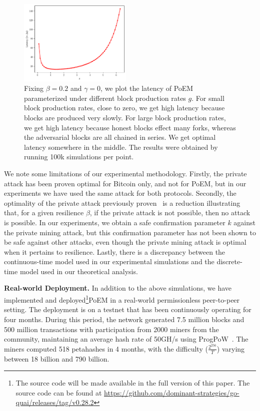 \begin{figure}[pt]
    \centering
    \includegraphics[width = 0.48\textwidth]{figures/g_latency.pdf}

  \caption{Fixing $\beta=0.2$ and $\gamma=0$, we plot the latency of PoEM parameterized under different block production rates $g$.
          For small block production rates, close to zero, we get high latency because blocks are produced very slowly.
          For large block production rates, we get high latency because honest blocks effect many forks, whereas the adversarial blocks
          are all chained in series. We get optimal latency somewhere in the middle.
          The results were obtained by running 100k simulations per point.}
    \label{fig:g_latency}
\end{figure}

We note some limitations of our experimental methodology. Firstly, the private attack has been proven optimal
for Bitcoin only, and not for PoEM, but in our experiments we have used the same attack for both protocols.
Secondly, the optimality of the private attack previously proven~\cite{eiar} is a reduction illustrating
that, for a given resilience $\beta$, if the private attack is not possible, then no attack is possible.
In our experiments, we obtain a safe confirmation parameter $k$ against the private mining attack,
but this confirmation parameter has not been shown to be safe against other attacks, even though the private
mining attack is optimal when it pertains to resilience.
Lastly, there is a discrepancy between the continuous-time model used in our experimental simulations
and the discrete-time model used in our theoretical analysis.

\noindent
\textbf{Real-world Deployment.}
In addition to the above simulations,
we have implemented and deployed\ifanonymous\else\footnote{
    \ifanonymous
        The source code will be made available in the full version of this paper.
    \else
        The source code can be found at
        \url{https://github.com/dominant-strategies/go-quai/releases/tag/v0.28.2}
    \fi
}\fi PoEM in a real-world permissionless peer-to-peer
setting.
The deployment is on a testnet that has been continuously operating for
four months. During this period, the network generated 7.5 million blocks
and 500 million transactions
with participation from 2000 miners from the community, maintaining an
average hash rate of 50GH/s using ProgPoW~\cite{progpow}.
The miners computed 518 petahashes in 4 months,
with the difficulty ($\frac{2^{256}}{T}$)
varying between 18 billion and 790 billion.
